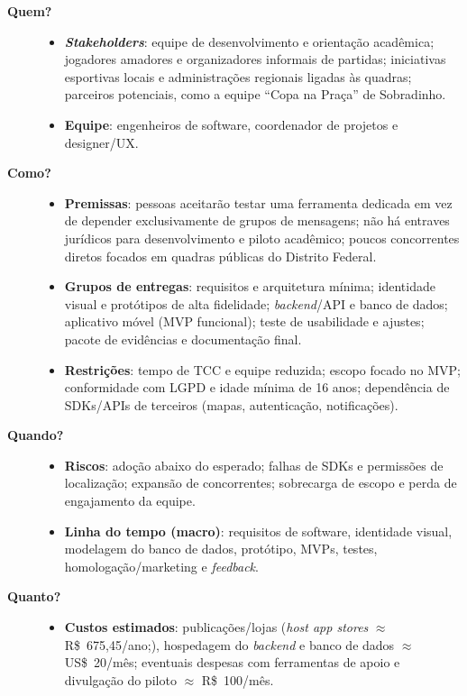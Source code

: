 \begin{description}
                \item[\textbf{Quem?}] 
                \begin{itemize}
                    \item \textbf{\textit{Stakeholders}}: equipe de desenvolvimento e orientação acadêmica; jogadores amadores e organizadores informais de partidas; iniciativas esportivas locais e administrações regionais ligadas às quadras; parceiros potenciais, como a equipe ``Copa na Praça'' de Sobradinho.
                    \item \textbf{Equipe}: engenheiros de software, coordenador de projetos e designer/UX.
                \end{itemize}

                \item[\textbf{Como?}] 
                \begin{itemize}
                    \item \textbf{Premissas}: pessoas aceitarão testar uma ferramenta dedicada em vez de depender exclusivamente de grupos de mensagens; não há entraves jurídicos para desenvolvimento e piloto acadêmico; poucos concorrentes diretos focados em quadras públicas do Distrito Federal.
                    \item \textbf{Grupos de entregas}: requisitos e arquitetura mínima; identidade visual e protótipos de alta fidelidade; \textit{backend}/API e banco de dados; aplicativo móvel (MVP funcional); teste de usabilidade e ajustes; pacote de evidências e documentação final.
                    \item \textbf{Restrições}: tempo de TCC e equipe reduzida; escopo focado no MVP; conformidade com LGPD e idade mínima de 16 anos; dependência de SDKs/APIs de terceiros (mapas, autenticação, notificações).
                \end{itemize}

                \item[\textbf{Quando?}] 
                \begin{itemize}
                    \item \textbf{Riscos}: adoção abaixo do esperado; falhas de SDKs e permissões de localização; expansão de concorrentes; sobrecarga de escopo e perda de engajamento da equipe.
                    \item \textbf{Linha do tempo (macro)}: requisitos de software, identidade visual, modelagem do banco de dados, protótipo, MVPs, testes, homologação/marketing e \textit{feedback}.
                \end{itemize}

                \item[\textbf{Quanto?}] 
                \begin{itemize}
                    \item \textbf{Custos estimados}: publicações/lojas (\textit{host app stores} \(\approx\) R\$~675,45/ano;), hospedagem do \textit{backend} e banco de dados \(\approx\) US\$~20/mês; eventuais despesas com ferramentas de apoio e divulgação do piloto \(\approx\) R\$~100/mês.
                \end{itemize}
        \end{description}

